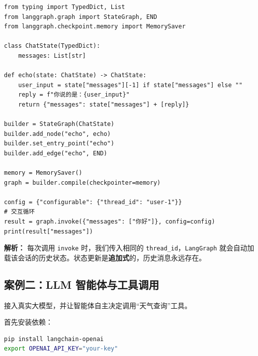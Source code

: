 \documentclass[12pt,a4paper]{ctexart}
\newcommand{\langgraph}{\texttt{LangGraph}}
\begin{document}
\begin{lstlisting}[caption={简单回显机器人}]
from typing import TypedDict, List
from langgraph.graph import StateGraph, END
from langgraph.checkpoint.memory import MemorySaver

class ChatState(TypedDict):
    messages: List[str]

def echo(state: ChatState) -> ChatState:
    user_input = state["messages"][-1] if state["messages"] else ""
    reply = f"你说的是：{user_input}"
    return {"messages": state["messages"] + [reply]}

builder = StateGraph(ChatState)
builder.add_node("echo", echo)
builder.set_entry_point("echo")
builder.add_edge("echo", END)

memory = MemorySaver()
graph = builder.compile(checkpointer=memory)

config = {"configurable": {"thread_id": "user-1"}}
# 交互循环
result = graph.invoke({"messages": ["你好"]}, config=config)
print(result["messages"])
\end{lstlisting}

\textbf{解析：} 每次调用 \texttt{invoke} 时，我们传入相同的 \texttt{thread\_id}，\langgraph{} 就会自动加载该会话的历史状态。状态更新是\textbf{追加式}的，历史消息永远存在。

\subsection{案例二：LLM 智能体与工具调用}
接入真实大模型，并让智能体自主决定调用“天气查询”工具。

首先安装依赖：
\begin{lstlisting}[language=bash]
pip install langchain-openai
export OPENAI_API_KEY="your-key"
\end{lstlisting}
\end{document}
